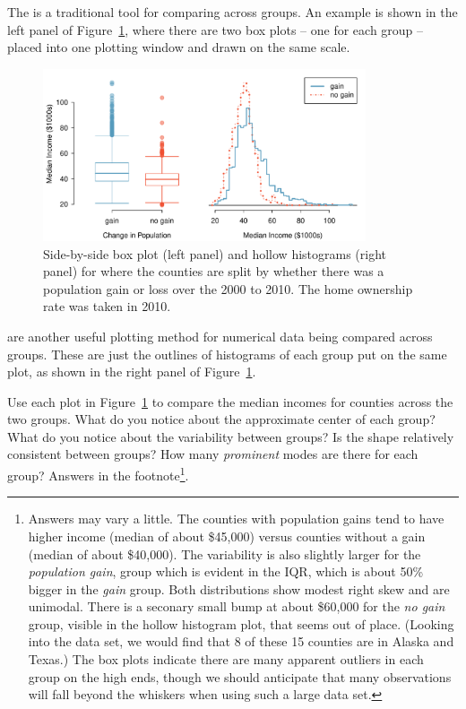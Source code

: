 The   is a traditional tool for comparing across groups. An example is shown in the left panel of Figure~\ref{countyIncomeSplitByPopGain}, where there are two box plots -- one for each group -- placed into one plotting window and drawn on the same scale.
\begin{figure}
   \centering
   \includegraphics[width=0.85\textwidth]{01/figures/countyIncomeSplitByPopGain/countyIncomeSplitByPopGain}
   \caption{Side-by-side box plot (left panel) and hollow histograms (right panel) for  where the counties are split by whether there was a population gain or loss over the 2000 to 2010. The home ownership rate was taken in 2010.}
   \label{countyIncomeSplitByPopGain}
\end{figure}

 are another useful plotting method for numerical data being compared across groups. These are just the outlines of histograms of each group put on the same plot, as shown in the right panel of Figure~\ref{countyIncomeSplitByPopGain}.

\begin{exercise} \label{comparingPriceByTypeExercise}
Use each plot in Figure~\ref{countyIncomeSplitByPopGain} to compare the median incomes for counties across the two groups. What do you notice about the approximate center of each group? What do you notice about the variability between groups? Is the shape relatively consistent between groups? How many \emph{prominent} modes are there for each group? Answers in the footnote\footnote{Answers may vary a little. The counties with population gains tend to have higher income (median of about \$45,000) versus counties without a gain (median of about \$40,000). The variability is also slightly larger for the \emph{population gain}, group which is evident in the IQR, which is about 50\% bigger in the \emph{gain} group. Both distributions show modest right skew and are unimodal. There is a seconary small bump at about \$60,000 for the \emph{no gain} group, visible in the hollow histogram plot, that seems out of place. (Looking into the data set, we would find that 8 of these 15 counties are in Alaska and Texas.) The box plots indicate there are many apparent outliers in each group on the high ends, though we should anticipate that many observations will fall beyond the whiskers when using such a large data set.}.
\end{exercise}

